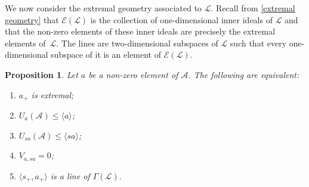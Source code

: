 \documentclass[oneside,a4paper]{amsart} %
\newtheorem{proposition}[theorem]{Proposition}
\theoremstyle{definition}
\newcommand{\A}{\mathcal{A}}
\newcommand{\LL}{\mathcal{L}}
\newcommand{\E}{\mathcal{E}}
\numberwithin{equation}{section}
\begin{document}
We now consider the extremal geometry associated to $\LL$.
Recall from \cref{extremal geometry} that $\E(\LL)$ is the collection of one-dimensional inner ideals of $\LL$ and that the non-zero elements of these inner ideals are precisely the extremal elements of~$\LL$. The lines are two-dimensional subspaces of $\LL$ such that every one-dimensional subspace of it is an element of $\E(\LL)$.
\begin{proposition}
\label{Characterization extremal J +}
	Let $a$ be a non-zero element of $\A$. The following are equivalent:
	\begin{enumerate}[\rm (a)]
		\item\label{ch:a} $a_+$ is extremal;
		\item\label{ch:b} $U_a(\A)\leq \langle a\rangle$; 
		\item\label{ch:c} $U_{sa}(\A)\leq \langle sa\rangle$; 
		\item\label{ch:d} $V_{a,sa}=0$;
		\item\label{ch:e} $\langle s_+,a_+\rangle$ is a line of $\Gamma(\LL)$.
	\end{enumerate}
\end{proposition}
\end{document}
